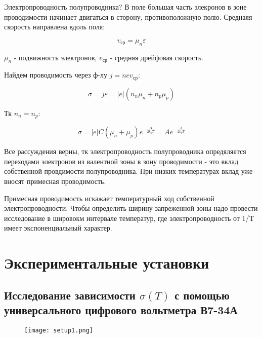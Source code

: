 \documentclass[a4paper]{article}
\begin{document}
Электропроводность полупроводника? В поле большая часть элекронов в зоне проводимости начинает двигаться в сторону, противоположную полю. 
Среднаяя скорость направлена вдоль поля:

\begin{equation}
    v_{ср} = \mu_n \varepsilon
\end{equation}

$\mu_n$ - подвижность электронов, $v_{ср}$ -  средняя дрейфовая скорость. \par 

Найдем проводимость через ф-лу $j = nev_{ср}$:

\begin{equation}
    \sigma = j \varepsilon  = |e| (n_n \mu_n + n_p \mu_p)
\end{equation}

Тк $n_n = n_p$:

\begin{equation}
    \sigma = |e|C(\mu_n + \mu_p) e^{- \frac{\Delta}{2k_b T}} = A e^{- \frac{\Delta}{2k_b T}}
\end{equation}

Все рассуждения верны, тк электропроводность полупроводника опредяляется переходами электронов из валентной зоны в зону проводимости - это вклад собственной провдимости полупроводника. 
При низких температурах вклад уже вносят примесная проводимость.  \par  

Примесная проводимость искажает температурный ход собственной электропроводности. Чтобы определить ширину запреженной зоны надо провести исследование в шировокм интервале температур, где электропроводность от 1/T
имеет экспоненциальный характер. 


\section{Экспериментальные установки}

\subsection{Исследование зависимости $\sigma(T)$ с помощью универсального цифрового вольтметра В7-34А}

\begin{figure}[H]
    \begin{center}
        \texttt{[image: setup1.png]}
        \caption{}
        \label{setup1}
    \end{center}
\end{figure}
\end{document}
